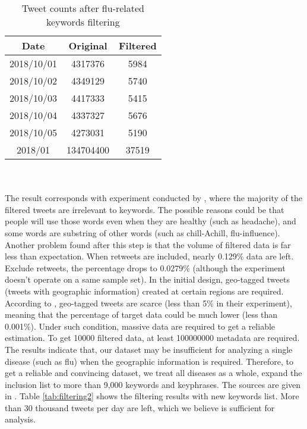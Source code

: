 \begin{table}[!htbp]
    \centering
    \hspace{0.5cm}
    \begin{tabular}{ccc}
        Date & Original & Filtered \\ \hline
        2018/10/01 & 4317376 & 5984 \\
        2018/10/02 & 4349129 & 5740 \\
        2018/10/03 & 4417333 & 5415 \\
        2018/10/04 & 4337327 & 5676 \\
        2018/10/05 & 4273031 & 5190 \\
        2018/01 & 134704400 & 37519 \\
    \end{tabular}
    \caption{Tweet counts after flu-related keywords filtering}
    \label{tab:filtering}
\end{table}
\\\\
The result corresponds with experiment conducted by \cite{culotta2010towards}, where the majority of the filtered tweets are irrelevant to keywords. The possible reasons could be that people will use those words even when they are healthy (such as headache), and some words are substring of other words (such as chill-Achill, flu-influence). Another problem found after this step is that the volume of filtered data is far less than expectation. When retweets are included, nearly 0.129\% data are left. Exclude retweets, the percentage drops to 0.0279\% (although the experiment doesn't operate on a same sample set). In the initial design, geo-tagged tweets (tweets with geographic information) created at certain regions are required. According to \cite{sloan}, geo-tagged tweets are scarce (less than 5\% in their experiment), meaning that the percentage of target data could be much lower (less than 0.001\%). Under such condition, massive data are required to get a reliable estimation. To get 10000 filtered data, at least 100000000 metadata are required. The results indicate that, our dataset may be insufficient for analyzing a single disease (such as flu) when the geographic information is required. Therefore, to get a reliable and convincing dataset, we treat all diseases as a whole, expand the inclusion list to more than 9,000 keywords and keyphrases. The sources are given in \cite{paul2011you}. Table \ref{tab:filtering2} shows the filtering results with new keywords list. More than 30 thousand tweets per day are left, which we believe is sufficient for analysis.
